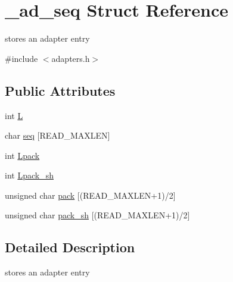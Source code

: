 \hypertarget{struct__ad__seq}{\section{\+\_\+ad\+\_\+seq Struct Reference}
\label{struct__ad__seq}
}


stores an adapter entry  




{\ttfamily \#include $<$adapters.\+h$>$}

\subsection*{Public Attributes}
\begin{DoxyCompactItemize}
\item 
int \hyperlink{struct__ad__seq_a99597df3a93bd8d1634909ffffb34982}{L}
\item 
char \hyperlink{struct__ad__seq_ad8ea16c086e40f863d19754edab9d67e}{seq} \mbox{[}R\+E\+A\+D\+\_\+\+M\+A\+X\+L\+E\+N\mbox{]}
\item 
int \hyperlink{struct__ad__seq_a3a0b2eebf83159fd543222389cce34f0}{Lpack}
\item 
int \hyperlink{struct__ad__seq_a04e987ac89615883c9a3b0f4ca36628b}{Lpack\+\_\+sh}
\item 
unsigned char \hyperlink{struct__ad__seq_acd1a87d098771d769affe62ee07d25ac}{pack} \mbox{[}(R\+E\+A\+D\+\_\+\+M\+A\+X\+L\+E\+N+1)/2\mbox{]}
\item 
unsigned char \hyperlink{struct__ad__seq_af631e16eb58ee89fc2bc82a89992ef4b}{pack\+\_\+sh} \mbox{[}(R\+E\+A\+D\+\_\+\+M\+A\+X\+L\+E\+N+1)/2\mbox{]}
\end{DoxyCompactItemize}


\subsection{Detailed Description}
stores an adapter entry 

